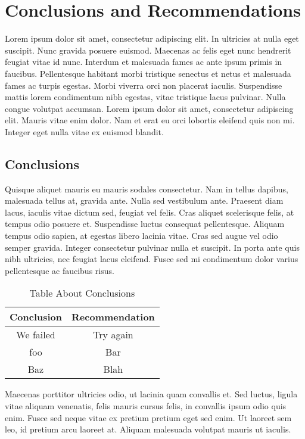 \documentclass[letterpaper]{../kuthesis/kuthesis}
\begin{document}

\chapter{Conclusions and Recommendations} \label{c:cnr}
Lorem ipsum dolor sit amet, consectetur adipiscing elit. In ultricies at nulla eget suscipit. Nunc gravida posuere euismod. Maecenas ac felis eget nunc hendrerit feugiat vitae id nunc. Interdum et malesuada fames ac ante ipsum primis in faucibus. Pellentesque habitant morbi tristique senectus et netus et malesuada fames ac turpis egestas. Morbi viverra orci non placerat iaculis. Suspendisse mattis lorem condimentum nibh egestas, vitae tristique lacus pulvinar. Nulla congue volutpat accumsan. Lorem ipsum dolor sit amet, consectetur adipiscing elit. Mauris vitae enim dolor. Nam et erat eu orci lobortis eleifend quis non mi. Integer eget nulla vitae ex euismod blandit.
\section{Conclusions}
Quisque aliquet mauris eu mauris sodales consectetur. Nam in tellus dapibus, malesuada tellus at, gravida ante. Nulla sed vestibulum ante. Praesent diam lacus, iaculis vitae dictum sed, feugiat vel felis. Cras aliquet scelerisque felis, at tempus odio posuere et. Suspendisse luctus consequat pellentesque. Aliquam tempus odio sapien, at egestas libero lacinia vitae. Cras sed augue vel odio semper gravida. Integer consectetur pulvinar nulla et suscipit. In porta ante quis nibh ultricies, nec feugiat lacus eleifend. Fusce sed mi condimentum dolor varius pellentesque ac faucibus risus.
\begin{table}[h!]
\centering
\caption{Table About Conclusions}
\begin{tabular}{|c | c|} 
 \hline
 Conclusion & Recommendation\\ 
 \hline
 We failed & Try again \\
 \hline
 foo & Bar \\
 \hline
 Baz & Blah\\
 \hline
\end{tabular}
\label{table:1}
\end{table}
\par \bigskip
Maecenas porttitor ultricies odio, ut lacinia quam convallis et. Sed luctus, ligula vitae aliquam venenatis, felis mauris cursus felis, in convallis ipsum odio quis enim. Fusce sed neque vitae ex pretium pretium eget sed enim. Ut laoreet sem leo, id pretium arcu laoreet at. Aliquam malesuada volutpat mauris ut iaculis. 
\end{document}
